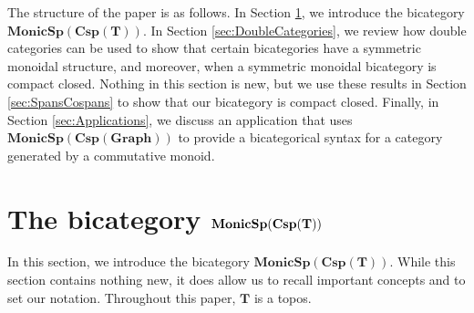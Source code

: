 \documentclass[11pt]{amsart}
\newcommand{\cat}[1]{\mathbf{#1}}
\newcommand{\bimonspcsp}[1]{\mathbf{MonicSp(Csp(#1))}}
\theoremstyle{remark}
\theoremstyle{definition}
\begin{document}
The structure of the paper is as follows.  
In Section 
	\ref{sec:Span cospan bicats}, 
we introduce the bicategory $\bimonspcsp{T}$.  
In Section 
	\ref{sec:DoubleCategories}, 
we review how double categories can be used 
to show that certain bicategories have a symmetric monoidal structure,
and moreover, when a symmetric monoidal bicategory is compact closed.  
Nothing in this section is new, but we use these results 
in Section \ref{sec:SpansCospans} 
to show that our bicategory is compact closed.
Finally, in Section 
	\ref{sec:Applications}, 
we discuss an application that uses $\bimonspcsp{Graph}$ to provide a bicategorical syntax  
for a category generated by a commutative monoid.

\section{The bicategory $\bold{MonicSp(Csp(T))}$} %
\label{sec:Span cospan bicats}

In this section, we introduce the bicategory $\bimonspcsp{T}$.  
While this section contains nothing new, 
it does allow us to recall important concepts and to set our notation. 
Throughout this paper, 
$\cat{T}$ is a topos.
\end{document}
